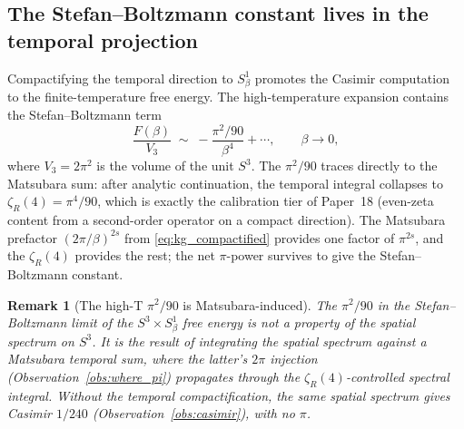 \documentclass[11pt]{article}
\newtheorem{remark}{Remark}
\begin{document}
\subsection{The Stefan--Boltzmann constant lives in the temporal projection}

Compactifying the temporal direction to $S^1_\beta$ promotes the
Casimir computation to the finite-temperature free energy.  The
high-temperature expansion contains the Stefan--Boltzmann term
\begin{equation}
\label{eq:sb}
\frac{F(\beta)}{V_3} \;\sim\; -\frac{\pi^2/90}{\beta^4} + \cdots,
\qquad \beta \to 0,
\end{equation}
where $V_3 = 2\pi^2$ is the volume of the unit $S^3$.  The
$\pi^2/90$ traces directly to the Matsubara sum: after analytic
continuation, the temporal integral collapses to $\zeta_R(4) = \pi^4 /
90$, which is exactly the calibration tier of Paper~18 (even-zeta
content from a second-order operator on a compact direction).  The
Matsubara prefactor $(2\pi/\beta)^{2s}$ from \eqref{eq:kg_compactified}
provides one factor of $\pi^{2s}$, and the $\zeta_R(4)$ provides the
rest; the net $\pi$-power survives to give the Stefan--Boltzmann
constant.

\begin{remark}[The high-T $\pi^2/90$ is Matsubara-induced]
\label{rem:sb_provenance}
The $\pi^2/90$ in the Stefan--Boltzmann limit of the $S^3 \times
S^1_\beta$ free energy is not a property of the spatial spectrum on
$S^3$.  It is the result of integrating the spatial spectrum against
a Matsubara temporal sum, where the latter's $2\pi$ injection
(Observation~\ref{obs:where_pi}) propagates through the
$\zeta_R(4)$-controlled spectral integral.  Without the temporal
compactification, the same spatial spectrum gives Casimir $1/240$
(Observation~\ref{obs:casimir}), with no $\pi$.
\end{remark}
\end{document}
